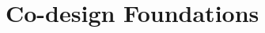\documentclass[12pt]{cmuthesis}
\begin{document}






%

\section{Co-design Foundations}
\label{sec:codesign}

\end{document}
